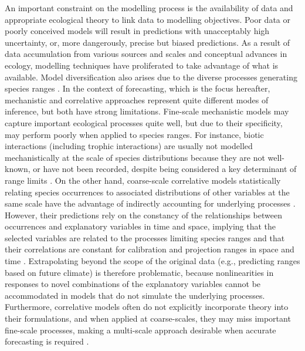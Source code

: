 An important constraint on the modelling process is the availability of data and appropriate ecological theory to  link data to modelling objectives.
Poor data or poorly conceived models will result in predictions with unacceptably high uncertainty, or, more dangerously, precise but biased predictions.
As a result of data accumulation from various sources and scales and conceptual advances in ecology, modelling techniques have proliferated to take advantage of what is available.
Model diversification also arises due to the diverse processes generating species ranges \citep{Soberon2007}.
In the context of forecasting, which is the focus hereafter, mechanistic and correlative approaches represent quite different modes of inference, but both have strong limitations. 
Fine-scale mechanistic models may capture important ecological processes quite well, but due to their specificity, may perform poorly when applied to species ranges.
For instance, biotic interactions (including trophic interactions) are usually not modelled mechanistically at the scale of species distributions because they are not well-known, or have not been recorded, despite being considered a key determinant of range limits \citep{Soberon2007, Roux2012, Guo2013, Pigot2013}. 
On the other hand, coarse-scale correlative models statistically relating species occurrences to associated distributions of other variables at the same scale have the advantage of indirectly accounting for underlying processes \citep{Guisan2000}.
However, their predictions rely on the constancy of the relationships between occurrences and explanatory variables in time and space, implying that the selected variables are related to the processes limiting species ranges and that their correlations are constant for calibration and projection ranges in space and time \citep{Dormann2007}. 
Extrapolating beyond the scope of the original data (e.g., predicting ranges based on future climate) is therefore problematic, because nonlinearities in responses to novel combinations of the explanatory variables cannot be accommodated in models that do not simulate the underlying processes.
Furthermore, correlative models often do not explicitly incorporate theory into their formulations, and when applied at coarse-scales, they may miss important fine-scale processes, making a multi-scale approach desirable when accurate forecasting is required \citep{Austin2007, Austin2011, Soranno2014}.

